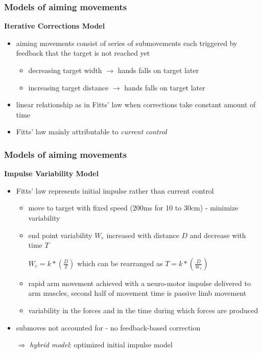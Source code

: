 \documentclass[]{beamer}
\begin{document}
\begin{frame}
 \frametitle{Models of aiming movements}
 \begin{overlayarea}{120mm}{70mm}
\textbf{Iterative Corrections Model}
\begin{itemize}
\setlength{\itemsep}{5pt}
 \item[]
 \item aiming movements consist of series of submovements each triggered by feedback that the target is not reached yet
 \begin{itemize}
\setlength{\itemsep}{3pt}
  \item[]
  \item decreasing target width $\rightarrow$ hands falls on target later
  \item increasing target distance $\rightarrow$ hands falls on target later
 \end{itemize}
  \item linear relationship as in Fitts' law when corrections take constant amount of time
  \item Fitts' law mainly attributable to \textit{current control}
\end{itemize}
\end{overlayarea}
\end{frame}


\begin{frame}
 \frametitle{Models of aiming movements}
\begin{overlayarea}{120mm}{70mm}
\textbf{Impulse Variability Model}
\begin{itemize}
\setlength{\itemsep}{5pt}
 \item Fitts' law represents initial impulse rather than current control

 \begin{itemize}
\setlength{\itemsep}{3pt}
  \item move to target with fixed speed (200ms for 10 to 30cm) - minimize variability
  \item end point variability $W_e$ increased with distance $D$ and decrease with time $T$   
  \item[] $W_e=k*(\frac{D}{T})$ which can be rearranged as $T= k*(\frac{D}{W_e})$  
  \item[] 
  \item rapid arm movement achieved with a neuro-motor impulse delivered to arm muscles, second half of movement time is passive limb movement
  \item variability in the forces and in the time during which forces are produced 
 \end{itemize}
\item submoves not accounted for - no feedback-based correction
\item[$\Rightarrow$] \textit{hybrid model}: optimized initial impulse model
\end{itemize}

\end{overlayarea}
\end{frame}
\end{document}
